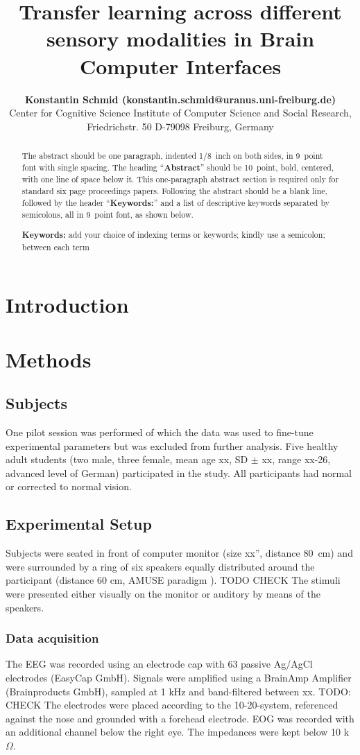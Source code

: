\documentclass[10pt,letterpaper]{article}
\title{Transfer learning across different sensory modalities in Brain Computer Interfaces}
\author{{\large \bf Konstantin Schmid (konstantin.schmid@uranus.uni-freiburg.de)} \\
	  Center for Cognitive Science Institute of Computer Science and Social Research,\\
	  Friedrichstr. 50 D-79098 Freiburg, Germany\\}
\begin{document}
\maketitle


\begin{abstract}
The abstract should be one paragraph, indented 1/8~inch on both sides,
in 9~point font with single spacing. The heading ``{\bf Abstract}''
should be 10~point, bold, centered, with one line of space below
it. This one-paragraph abstract section is required only for standard
six page proceedings papers. Following the abstract should be a blank
line, followed by the header ``{\bf Keywords:}'' and a list of
descriptive keywords separated by semicolons, all in 9~point font, as
shown below.

\textbf{Keywords:} 
add your choice of indexing terms or keywords; kindly use a
semicolon; between each term
\end{abstract}

\section{Introduction}

\section{Methods}

\subsection{Subjects}
One pilot session was performed of which the data was used to fine-tune experimental parameters but was excluded from further analysis.
Five healthy adult students (two male, three female, mean age xx, SD $\pm$ xx, range xx-26, advanced level of German) participated in the study.
All participants had normal or corrected to normal vision.

\subsection{Experimental Setup}
Subjects were seated in front of computer monitor (size xx'', distance 80\ cm) and were surrounded by a ring of six speakers equally distributed around the participant (distance 60 cm, AMUSE paradigm \cite{Schreuder_2010}). TODO CHECK
The stimuli were presented either visually on the monitor or auditory by means of the speakers.
 
\subsubsection{Data acquisition}
The EEG was recorded using an electrode cap with 63 passive Ag/AgCl electrodes (EasyCap GmbH).
Signals were amplified using a BrainAmp Amplifier (Brainproducts GmbH), sampled at 1 kHz and band-filtered between xx. TODO: CHECK
The electrodes were placed according to the 10-20-system, referenced against the nose and grounded with a forehead electrode.
EOG was recorded with an additional channel below the right eye.
The impedances were kept below 10 k$\Omega$.
\end{document}
